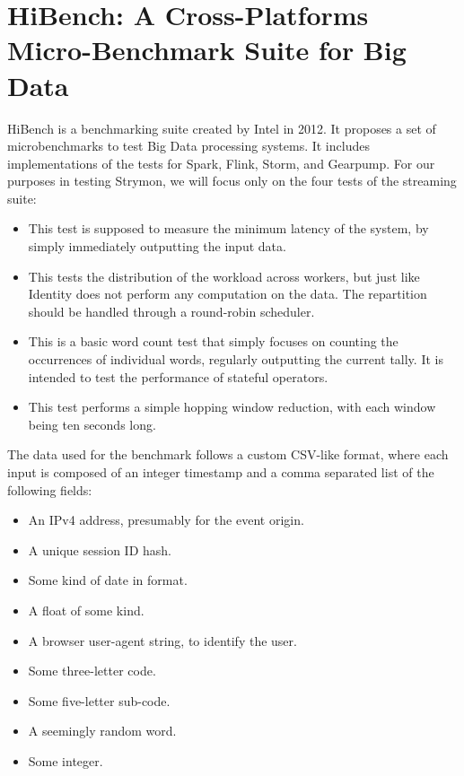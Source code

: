 \section{HiBench: A Cross-Platforms Micro-Benchmark Suite for Big Data}\label{section:hibench}
HiBench\cite{hibench} is a benchmarking suite created by Intel in 2012. It proposes a set of microbenchmarks to test Big Data processing systems. It includes implementations of the tests for Spark, Flink, Storm, and Gearpump. For our purposes in testing Strymon, we will focus only on the four tests of the streaming suite:

\begin{itemize}
\item {} This test is supposed to measure the minimum latency of the system, by simply immediately outputting the input data.
\item {} This tests the distribution of the workload across workers, but just like Identity does not perform any computation on the data. The repartition should be handled through a round-robin scheduler.
\item {} This is a basic word count test that simply focuses on counting the occurrences of individual words, regularly outputting the current tally. It is intended to test the performance of stateful operators.
\item {} This test performs a simple hopping window reduction, with each window being ten seconds long.
\end{itemize}

The data used for the benchmark follows a custom CSV-like format, where each input is composed of an integer timestamp and a comma separated list of the following fields:

\begin{itemize}
\item {} An IPv4 address, presumably for the event origin.
\item {} A unique session ID hash.
\item {} Some kind of date in  format.
\item {} A float of some kind.
\item {} A browser user-agent string, to identify the user.
\item {} Some three-letter code.
\item {} Some five-letter sub-code.
\item {} A seemingly random word.
\item {} Some integer.
\end{itemize}


